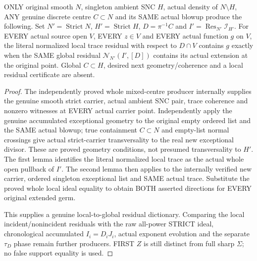 \begin{theorem}
\label{hir:sharp-actual-mixed-centre-strict-trace-full-open-residual}
\leanok
ONLY original smooth $N$, singleton ambient SNC $H$, actual density of
$N\setminus H$, ANY genuine discrete centre $C\subset N$ and its SAME
actual blowup produce the following. Set $N'=\operatorname{Strict}N$,
$H'=\operatorname{Strict}H$, $D=\pi^{-1}C$ and
$I'=\operatorname{Res}_{N'}\mathcal I_{H'}$. For EVERY actual source
open $V$, EVERY $z\in V$ and EVERY actual function $g$ on $V$, the
literal normalized local trace residual with respect to $D\cap V$
contains $g$ exactly when the SAME global residual
$\mathcal N_{N'}(I',[D])$ contains its actual extension at the original
point. Global $C\subset H$, desired next geometry/coherence and a local
residual certificate are absent.
\end{theorem}
\begin{proof}
The independently proved whole mixed-centre producer internally supplies
the genuine smooth strict carrier, actual ambient SNC pair, trace
coherence and nonzero witnesses at EVERY actual carrier point. Independently
apply the genuine accumulated exceptional geometry to the original empty
ordered list and the SAME actual blowup; true containment $C\subset N$
and empty-list normal crossings give actual strict-carrier transversality
to the real new exceptional divisor. These are proved geometry conditions,
not presumed transversality to $H'$. The first lemma identifies the
literal normalized local trace as the actual whole open pullback of $I'$.
The second lemma then applies to the internally verified new carrier,
ordered singleton exceptional list and SAME actual trace. Substitute the
proved whole local ideal equality to obtain BOTH asserted directions for
EVERY original extended germ.

This supplies a genuine local-to-global residual dictionary. Comparing the
local incident/nonincident residuals with the raw all-power STRICT ideal,
chronological accumulated $I_i=D_iJ_i$, actual exponent evolution and the
separate $\tau_D$ phase remain further producers. FIRST $Z$ is still
distinct from full sharp $\Sigma$; no false support equality is used.
\end{proof}
